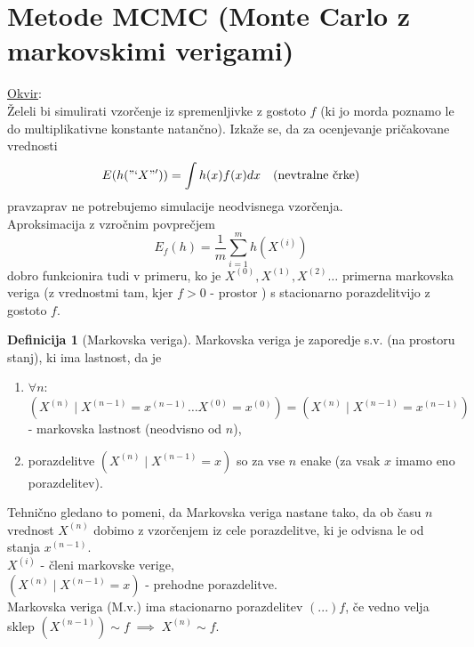 \documentclass[a4paper, 12pt]{book}
\theoremstyle{definition}
\newtheorem{defn}[counter]{Definicija}
\theoremstyle{remark}
\begin{document}

\section{Metode MCMC (Monte Carlo z markovskimi verigami)}

\underline{Okvir}: \\
Želeli bi simulirati vzorčenje iz  spremenljivke z gostoto $f$
(ki jo morda poznamo le do multiplikativne konstante natančno).
Izkaže se, da za ocenjevanje pričakovane vrednosti
\begin{equation*}
  E(h("`X"')) = \int h(x) f(x) dx \quad \text{(nevtralne črke)}
\end{equation*}
pravzaprav ne potrebujemo simulacije neodvisnega vzorčenja. \\
Aproksimacija z vzročnim povprečjem
\begin{equation*}
  E_f(h) = \frac{1}{m} \sum_{i=1}^{m} h\left(X^{(i)}\right)
\end{equation*}
dobro funkcionira tudi v primeru, ko je $X^{(0)}, X^{(1)}, X^{(2)} \dots$ primerna markovska veriga
(z vrednostmi tam, kjer $f > 0$ - prostor ) s stacionarno porazdelitvijo z gostoto $f$.
\begin{defn}[Markovska veriga]
  Markovska veriga je zaporedje s.v. (na prostoru stanj), ki ima lastnost, da je
  \begin{enumerate}[label=(\roman*)]
    \item $\forall n:$
      \begin{equation*}
        (X^{(n)} \mid X^{(n-1)} = x^{(n-1)} \dots X^{(0)} = x^{(0)}) = (X^{(n)} \mid X^{(n-1)} = x^{(n-1)})
      \end{equation*}
      - markovska lastnost (neodvisno od $n$),
    \item porazdelitve $(X^{(n)} \mid X^{(n-1)} = x)$ so za vse $n$ enake (za vsak $x$ imamo eno porazdelitev).
  \end{enumerate}
\end{defn}
Tehnično gledano to pomeni, da Markovska veriga nastane tako,
da ob času $n$ vrednost $X^{(n)}$ dobimo z vzorčenjem iz cele porazdelitve, ki je odvisna le od stanja $x^{(n-1)}$. \\
$X^{(i)}$ - členi markovske verige, \\
$(X^{(n)} \mid X^{(n-1)} = x)$ - prehodne porazdelitve. \\
Markovska veriga (M.v.) ima stacionarno porazdelitev $(...)f$, če vedno velja sklep $(X^{(n-1)}) \sim f \; \implies \; X^{(n)} \sim f$. \\
\end{document}
